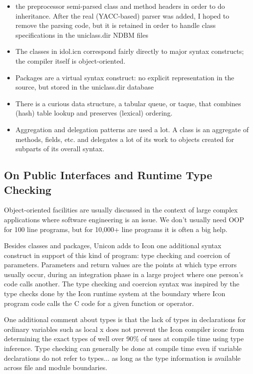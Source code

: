 \liststyleLxliv
\begin{itemize}
\item 
the preprocessor semi-parsed class and method headers in order to do inheritance. After the real (YACC-based) parser was
added, I hoped to remove the parsing code, but it is retained in order to handle class specifications in the
uniclass.dir NDBM files 
\item 
The classes in idol.icn correspond fairly directly to major syntax constructs; the compiler itself is object-oriented. 
\item 
Packages are a {\textquotedbl}virtual syntax construct{\textquotedbl}: no explicit representation in the source, but
stored in the uniclass.dir database 
\item 
There is a curious data structure, a tabular queue, or taque, that combines (hash) table lookup and preserves (lexical)
ordering. 
\item 
Aggregation and delegation patterns are used a lot. A class is an aggregate of methods, fields, etc. and delegates a lot
of its work to objects created for subparts of its overall syntax. 
\end{itemize}

\subsection{On Public Interfaces and Runtime Type Checking}

Object-oriented facilities are usually discussed in the context of
large complex applications where software engineering is an issue. We
don't usually need OOP for 100 line programs, but for 10,000+ line
programs it is often a big help.

Besides classes and packages, Unicon adds to Icon one additional
syntax construct in support of this kind of program: type checking and
coercion of parameters. Parameters and return values are the points at
which type errors usually occur, during an integration phase in a
large project where one person's code calls another. The type checking
and coercion syntax was inspired by the type checks done by the Icon
runtime system at the boundary where Icon program code calls the C
code for a given function or operator.


One additional comment about types is that the lack of types in
declarations for ordinary variables such as {\textquotedbl}local
x{\textquotedbl} does not prevent the Icon compiler iconc from
determining the exact types of well over 90\% of uses at compile time
using type inference. Type checking can generally be done at compile
time even if variable declarations do not refer to types... as long as
the type information is available across file and module boundaries.

